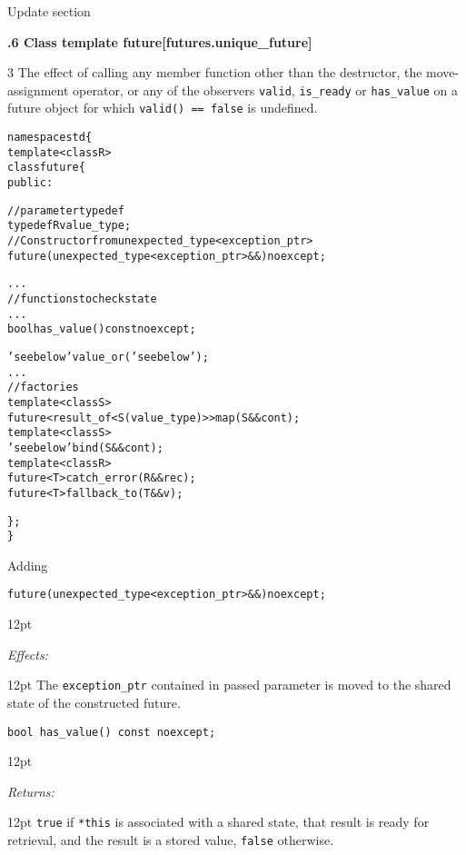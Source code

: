 \documentclass[a4paper,10pt]{article}
\newcommand{\wordingUpdateSubSubSec}[2]{\vspace{15pt}
\noindent
{\textbf{\quad #1\hfill\textbf{[#2]}}}
\label{#2}
\vspace{7pt}
}
\newcommand{\cpp}[1]{\lstinline{#1}}
\newcommand{\wordingItem}[1]{\noindent\textit{#1:}}
\newenvironment{wordingPara}{\begin{adjustwidth}{12pt}{}}{\end{adjustwidth}}
\newenvironment{Effects}{\wordingItem{Effects}\vspace{7pt}\noindent\begin{adjustwidth}{12pt}{}}{\vspace{7pt}\end{adjustwidth}}
\newenvironment{Returns}{\wordingItem{Returns}\vspace{7pt}\noindent\begin{adjustwidth}{12pt}{}}{\vspace{7pt}\end{adjustwidth}}
\newcommand{\add}[1]{\textcolor{dkgreen}{#1}}
\newcommand{\update}[1]{\colorbox{update_color}{#1}}
\begin{document}
\noindent
Update section

\wordingUpdateSubSubSec{30.6.6 Class template future}{futures.unique_future}

3 The effect of calling any member function other than the destructor, the move-assignment operator, or \add{any of the observers} \cpp{valid}, \cpp{is_ready} or \add{\cpp{has_value}} on a future object for which \cpp{valid() == false} is undefined.

\begin{alltt}
namespace std \{
  template <class R>
  class future \{
  public:
\add{
    // parameter typedef
    typedef R value_type;
    // Constructor from unexpected_type<exception_ptr> 
    future(unexpected_type<exception_ptr>&&) noexcept;  

  ...
    // functions to check state
    ...
    bool has_value() const noexcept;

    'see below' value_or('see below');
  ...
    // factories
    template <class S>
      future<result_of<S(value_type)>> map(S&& cont);
    template <class S>
      'see below' bind(S&& cont);
    template <class R>
      future<T> catch_error(R&& rec);
    future<T> fallback_to(T&& v);
}
  \};
\}
\end{alltt}

\noindent
Adding

\begin{alltt}
\update{future(unexpected_type<exception_ptr>&&) noexcept; }
\end{alltt}

\begin{wordingPara}

\begin{Effects}
The \cpp{exception_ptr} contained in passed parameter is moved to the shared state of the constructed future. 
\end{Effects}

\end{wordingPara}

\begin{lstlisting}[xleftmargin=0pt]
bool has_value() const noexcept;
\end{lstlisting}

\begin{wordingPara}

\begin{Returns} \cpp{true} if \cpp{*this} is associated with a shared state, that result is ready for retrieval, and the result is a stored value, \cpp{false} otherwise.
\end{Returns}

\end{wordingPara}
\end{document}
